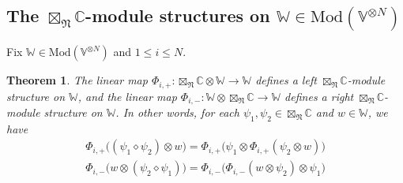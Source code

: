 \documentclass[11pt,b5paper,notitlepage]{article}
\theoremstyle{definition}
\theoremstyle{plain}
\newtheorem{thm}[df]{Theorem}
\newcommand{\Vbb}{\mathbb V}
\newcommand{\Wbb}{\mathbb W}
\newcommand{\Cbb}{\mathbb C}
\newcommand{\<}{\left\langle}
\renewcommand{\>}{\right\rangle}
\newcommand{\Mod}{\mathrm{Mod}}
\newcommand{\fn}{\mathfrak{N}}
\numberwithin{equation}{section}
\begin{document}
\subsection{The $\boxtimes_\fn\Cbb$-module structures on $\Wbb\in\Mod(\Vbb^{\otimes N})$}



Fix $\Wbb\in\Mod(\Vbb^{\otimes N})$ and $1\leq i\leq N$.


\begin{thm}\label{lb50}
The linear map $\Phi_{i,+}:\boxtimes_\fn\Cbb\otimes\Wbb\rightarrow\Wbb$ defines a left $\boxtimes_\fn\Cbb$-module structure on $\Wbb$, and the linear map $\Phi_{i,-}:\Wbb\otimes\boxtimes_\fn\Cbb\rightarrow\Wbb$ defines a right $\boxtimes_\fn\Cbb$-module structure on $\Wbb$. In other words, for each $\psi_1,\psi_2\in\boxtimes_\fn\Cbb$ and $w\in\Wbb$, we have
\begin{gather}
\Phi_{i,+}\big((\psi_1\diamond\psi_2)\otimes w\big)=\Phi_{i,+}\big(\psi_1\otimes\Phi_{i,+}(\psi_2\otimes w)\big)\label{eq124}\\
\Phi_{i,-}\big(w\otimes(\psi_2\diamond\psi_1)\big)=\Phi_{i,-}\big(\Phi_{i,-}(w\otimes\psi_2)\otimes\psi_1\big)\label{eq125}
\end{gather}
\end{thm}
\end{document}
